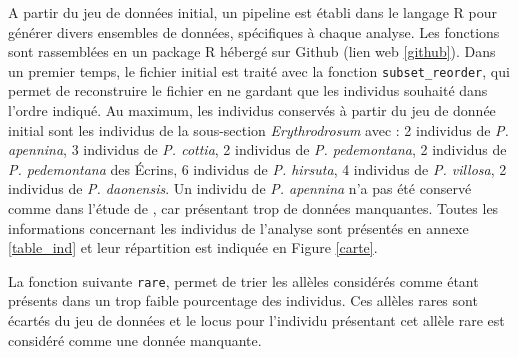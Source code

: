 A partir du jeu de données initial, un pipeline est établi dans le langage R \citep{RTeam2017} pour générer divers ensembles de données, spécifiques à chaque analyse. Les fonctions sont rassemblées en un package R hébergé sur Github (lien web \ref{github}). Dans un premier temps, le fichier initial est traité avec la fonction \verb|subset_reorder|, qui permet de reconstruire le fichier en ne gardant que les individus souhaité dans l'ordre indiqué. Au maximum, les individus conservés à partir du jeu de donnée initial sont les individus de la sous-section \textit{Erythrodrosum} avec :
2 individus de \textit{P. apennina}, 
3 individus de \textit{P. cottia}, 
2 individus de \textit{P. pedemontana}, 
2 individus de \textit{P. pedemontana} des Écrins, 
6 individus de \textit{P. hirsuta}, 
4 individus de \textit{P. villosa}, 
2 individus de \textit{P. daonensis}.
Un individu de \textit{P. apennina} n'a pas été conservé comme dans l'étude de \citet{Boucher2016a}, car présentant trop de données manquantes. Toutes les informations concernant les individus de l'analyse sont présentés en annexe \ref{table_ind} et leur répartition est indiquée en Figure \ref{carte}.

La fonction suivante \verb|rare|, permet de trier les allèles considérés comme étant présents dans un trop faible pourcentage des individus. Ces allèles rares sont écartés du jeu de données et le locus pour l'individu présentant cet allèle rare est considéré comme une donnée manquante.

 

